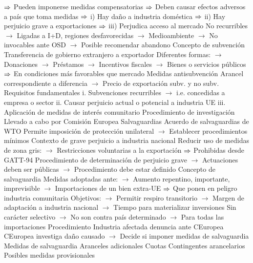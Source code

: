 \documentclass{nuevotema}
\begin{document}
\begin{esquemal}
				\4[] $\Rightarrow$ Pueden imponerse medidas compensatorias
				\4[] $\Rightarrow$ Deben causar efectos adversos a país que toma medidas
				\4[] $\Rightarrow$ i) Hay daño a industria doméstica
				\4[] $\Rightarrow$ ii) Hay perjuicio grave a exportaciones
				\4[] $\Rightarrow$ iii) Perjudica acceso al mercado
				\4[] No recurribles
				\4[] $\to$ Ligadas a I+D, regiones desfavorecidas
				\4[] $\to$ Medioambiente
				\4[] $\to$ No invocables ante OSD
				\4[] $\to$ Posible recomendar abandono
				\4 Concepto de subvención
				\4[] Transferencia de gobierno extranjero a exportador
				\4[] Diferentes formas:
				\4[] $\to$ Donaciones
				\4[] $\to$ Préstamos
				\4[] $\to$ Incentivos fiscales
				\4[] $\to$ Bienes o servicios públicos
				\4[] $\Rightarrow$ En condiciones más favorables que mercado
				\4 Medidas antisubvención
				\4[] Arancel correspondiente a diferencia
				\4[] $\to$ Precio de exportación subv. y no subv.
				\4 Requisitos fundamentales
				\4[] i. Subvenciones recurribles
				\4[] $\to$ i.e. concedidas a empresa o sector
				\4[] ii. Causar perjuicio actual o potencial a industria UE
				\4[] iii. Aplicación de medidas de interés comunitario
				\4 Procedimiento de investigación
				\4[] Llevado a cabo por Comisión Europea
			\3 Salvaguardias
				\4 Acuerdo de salvaguardias de WTO
				\4[] Permite imposición de protección unilateral
				\4[] $\to$ Establecer procedimientos mínimos
				\4[] Contexto de grave perjuicio a industria nacional
				\4[] Reducir uso de medidas de zona gris:
				\4[] $\to$ Restricciones voluntarias a la exportación
				\4[] $\Rightarrow$ Prohibidas desde GATT-94
				\4[] Procedimiento de determinación de perjuicio grave
				\4[] $\to$ Actuaciones deben ser públicas
				\4[] $\to$ Procedimiento debe estar definido
				\4 Concepto de salvaguardia
				\4[] Medidas adoptadas ante:
				\4[] $\to$ Aumento repentino, importante, imprevisible
				\4[] $\to$ Importaciones de un bien extra-UE
				\4[] $\Rightarrow$ Que ponen en peligro industria comunitaria
				\4[] Objetivos:
				\4[] $\to$ Permitir respiro transitorio
				\4[] $\to$ Margen de adaptación a industria nacional
				\4[] $\to$ Tiempo para materializar inversiones
				\4[] Sin carácter selectivo
				\4[] $\to$ No son contra país determinado
				\4[] $\to$ Para todas las importaciones
				\4 Procedimiento
				\4[] Industria afectada denuncia ante CEuropea
				\4[] CEuropea investiga daño causado
				\4[] $\to$ Decide si imponer medidas de salvaguardia
				\4 Medidas de salvaguardia
				\4[] Aranceles adicionales
				\4[] Cuotas
				\4[] Contingentes arancelarios
				\4[] Posibles medidas provisionales

\end{esquemal}
\end{document}
